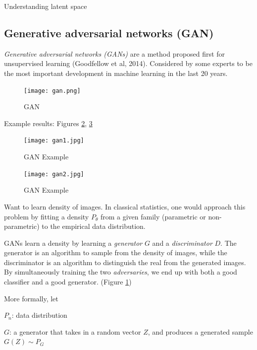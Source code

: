 \documentclass[english]{article}
\begin{document}
\item Understanding latent space

\eenum 

 
\subsection{Generative adversarial networks (GAN)}

\benum
\item \emph{Generative adversarial networks (GANs)} are a method proposed first for unsupervised learning (Goodfellow et al, 2014). Considered by some experts to be the most important development in machine learning in the last 20 years. 
\begin{figure}
  \centering
  \texttt{[image: gan.png]}
    \caption{GAN}
    \label{gan}
\end{figure}

\item Example results: Figures \ref{gan1}, \ref{gan2}

\begin{figure}
  \centering
  \texttt{[image: gan1.jpg]}
    \caption{GAN Example}
    \label{gan1}
\end{figure}
\begin{figure}
  \centering
  \texttt{[image: gan2.jpg]}
    \caption{GAN Example}
    \label{gan2}
\end{figure}

\item 
 Want to learn density of images. In classical statistics, one would approach this problem by fitting a density $P_\theta$ from a given family (parametric or non-parametric) to the empirical data distribution. 

 GANs learn a density by learning a \emph{generator} $G$ and a \emph{discriminator} $D$. The generator is an algorithm to sample from the density of images, while the discriminator is an algorithm to distinguish the real from the generated images. By simultaneously training the two \emph{adversaries}, we end up with both a good classifier and a good generator. (Figure \ref{gan})
 

 \item 
More formally, let 

\bitem
 \item 

$P_n$: data distribution
 \item 

$G$: a generator that takes in a random vector $Z$, and produces a generated sample $G(Z) \sim P_G$
 \item 
\end{document}
